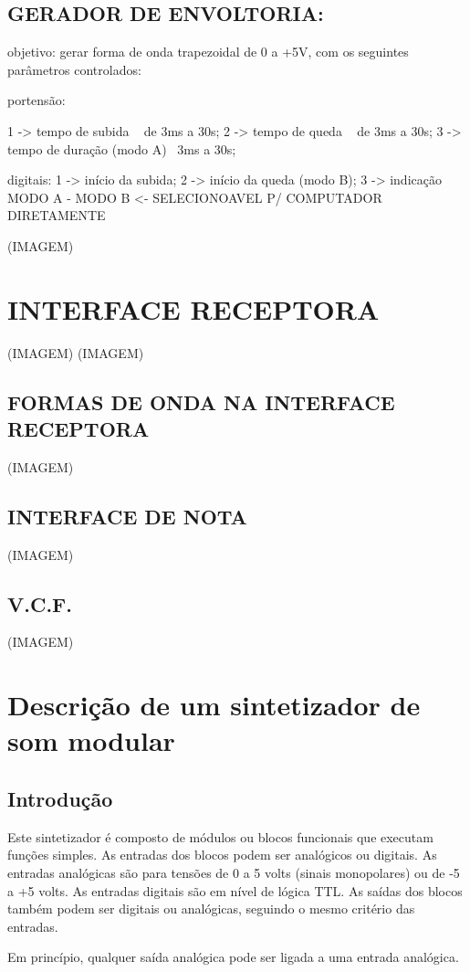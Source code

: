 \documentclass{article}
\begin{document}
\subsection{GERADOR DE ENVOLTORIA:}
objetivo: gerar forma de onda trapezoidal de 0 a +5V, com os seguintes parâmetros controlados:

portensão:

1 -> tempo de subida ~ de 3ms a 30s;
2 -> tempo de queda ~ de 3ms a 30s;
3 -> tempo de duração (modo A) ~3ms a 30s;


digitais:
1 -> início da subida;
2 -> início da queda (modo B);
3 -> indicação MODO A - MODO B <- SELECIONOAVEL P/ COMPUTADOR DIRETAMENTE

(IMAGEM)

\section{INTERFACE RECEPTORA}
(IMAGEM)
(IMAGEM)

\subsection{FORMAS DE ONDA NA INTERFACE RECEPTORA}
(IMAGEM)

\subsection{INTERFACE DE NOTA}
(IMAGEM)

\subsection{V.C.F.}
(IMAGEM)

\section{Descrição de um sintetizador de som modular}
\subsection{Introdução}
Este sintetizador é composto de módulos ou blocos funcionais que executam funções simples. As entradas dos blocos podem ser analógicos ou digitais. As entradas analógicas são para tensões de 0 a 5 volts (sinais monopolares) ou de -5 a +5 volts.
As entradas digitais são em nível de lógica TTL. As saídas dos blocos também podem ser digitais ou analógicas, seguindo o mesmo critério das entradas.

Em princípio, qualquer saída analógica pode ser ligada a uma entrada analógica.
\end{document}
